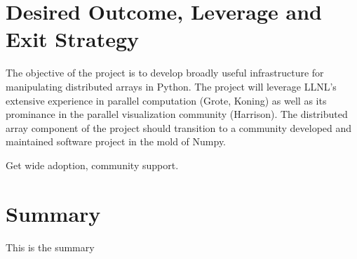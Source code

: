 \documentclass[a4paper]{article}
\begin{document}
\section*{Desired Outcome, Leverage and Exit Strategy}

The objective of the project is to develop broadly useful infrastructure for manipulating distributed arrays in Python.  The project will leverage LLNL's extensive experience in parallel computation (Grote, Koning) as well as its prominance in the parallel visualization community (Harrison).   The distributed array component of the project should transition to a community developed and maintained software project in the mold of Numpy.

Get wide adoption, community support.



\section*{Summary}

This is the summary
\end{document}
